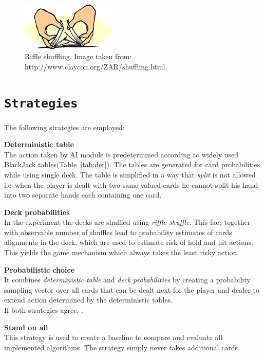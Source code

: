 \documentclass[12pt,a4paper,twocolumn]{article}
\begin{document}
\begin{figure}[htbp]
\centering
\includegraphics[width=0.4\textwidth]{shuffle}
\caption{Riffle shuffling. Image taken from: http://www.claycon.org/ZAR/shuffling.html.\label{fig:shufflin}}
\end{figure}

\section*{\texttt{Strategies}}
The following strategies are employed:
\begin{description}
\item{\textbf{Deterministic table}} \hfill\\
The action taken by AI module is predetermined according to widely used BlackJack tables(Table~\ref{tab:det}). The tables are generated for card probabilities while using single deck. The table is simplified in a way that \emph{split} is not allowed i.e\ when the player is dealt with two same valued cards he cannot split his hand into two separate hands each containing one card.
\item{\textbf{Deck probabilities}} \hfill\\
In the experiment the decks are shuffled using \emph{riffle shuffle}. This fact together with observable number of shuffles lead to probability estimates of cards alignments in the deck, which are used to estimate risk of hold and hit actions. This yields the game mechanism which always takes the least risky action.
\item{\textbf{Probabilistic choice}} \hfill\\
It combines \emph{deterministic table} and \emph{deck probabilities} by creating a probability sampling vector over all cards that can be dealt next for the player and dealer to extend action determined by the deterministic tables.\\
If both strategies agree, .
\item{\textbf{Stand on all}} \hfill\\
This strategy is used to create a baseline to compare and evaluate all implemented algorithms. The strategy simply never takes additional cards.
\end{description}
\end{document}
